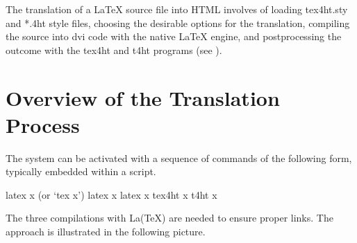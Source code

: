 
The translation of a LaTeX source file into HTML involves of loading tex4ht.sty
and *.4ht style files, choosing the desirable options for the translation,
compiling the source into dvi code with the native LaTeX engine, and
postprocessing the outcome with the tex4ht and t4ht programs (see ). 


\section{Overview of the Translation Process}\label{sec:overview}

The system can be activated with a sequence of commands of the following form, typically embedded within a script.

\begin{shellcommand}
latex      x            (or ‘tex x’) 
latex      x 
latex      x 
tex4ht     x 
t4ht       x 
\end{shellcommand}

The three compilations with La(TeX) are needed to ensure proper links. The approach is illustrated in the following picture. 

